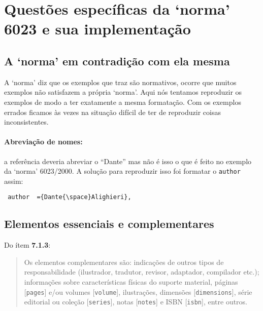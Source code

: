 \documentclass[a4paper]{ltxdoc}
\begin{document}



\appendix

\section{Questões específicas da `norma' 6023 e sua implementação}

\subsection{A `norma' em contradição com ela mesma}

A `norma' diz que os exemplos que traz são normativos, ocorre
que muitos exemplos não satisfazem a própria `norma'.
Aqui nós tentamos reproduzir os exemplos de modo a ter exatamente
a mesma formatação. Com os exemplos errados ficamos às vezes na
situação difícil de ter de reproduzir coisas inconsistentes.

\paragraph{Abreviação de nomes:} a referência 
deveria abreviar o ``Dante'' mas não é isso o que é feito no
exemplo da `norma' 6023/2000\cite{NBR6023:2000}.
A solução para reproduzir isso foi formatar o {\tt author} assim:
\begin{verbatim}
 author  ={Dante{\space}Alighieri},
\end{verbatim}

\subsection{Elementos essenciais e complementares}

Do ítem {\bf 7.1.3}\cite{NBR6023:2000}:
\begin{quote}
Os elementos complementares são: indicações de outros tipos de responsabilidade
(ilustrador, tradutor, revisor, adaptador, compilador etc.);
informações sobre características físicas do suporte material, páginas
[{\tt pages}] e/ou
volumes [{\tt volume}], ilustrações,
dimensões [{\tt dimensions}]\cite{7.1.3-1,7.1.3-2},
série editorial ou coleção [{\tt series}], notas [{\tt notes}] e
ISBN [{\tt isbn}]\cite{7.1.3-1,7.1.3-2}, entre outros.
\end{quote}
\end{document}
